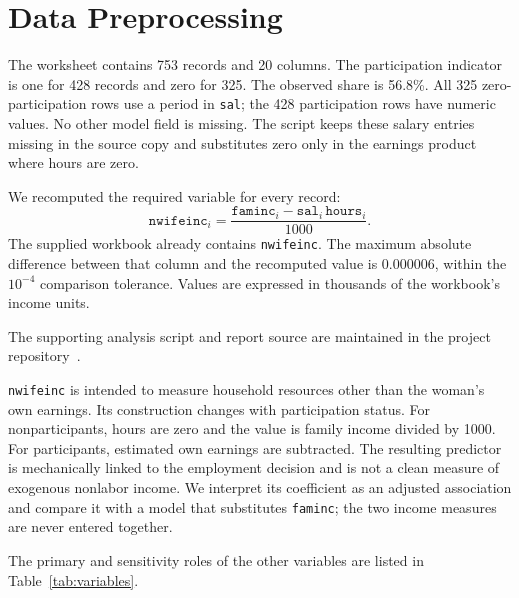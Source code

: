 \documentclass[conference]{IEEEtran}
\begin{document}
\section{Data Preprocessing}
The worksheet contains 753 records and 20 columns. The participation indicator is one for 428 records and zero for 325. The observed share is 56.8\%. All 325 zero-participation rows use a period in \texttt{sal}; the 428 participation rows have numeric values. No other model field is missing. The script keeps these salary entries missing in the source copy and substitutes zero only in the earnings product where hours are zero.

We recomputed the required variable for every record:
\[
\texttt{nwifeinc}_i = \frac{\texttt{faminc}_i - \texttt{sal}_i\,\texttt{hours}_i}{1000}.
\]
The supplied workbook already contains \texttt{nwifeinc}. The maximum absolute difference between that column and the recomputed value is $0.000006$, within the $10^{-4}$ comparison tolerance. Values are expressed in thousands of the workbook's income units.

The supporting analysis script and report source are maintained in the project repository~\cite{repo}.

\texttt{nwifeinc} is intended to measure household resources other than the woman's own earnings. Its construction changes with participation status. For nonparticipants, hours are zero and the value is family income divided by 1000. For participants, estimated own earnings are subtracted. The resulting predictor is mechanically linked to the employment decision and is not a clean measure of exogenous nonlabor income. We interpret its coefficient as an adjusted association and compare it with a model that substitutes \texttt{faminc}; the two income measures are never entered together.

The primary and sensitivity roles of the other variables are listed in Table~\ref{tab:variables}.
\end{document}

